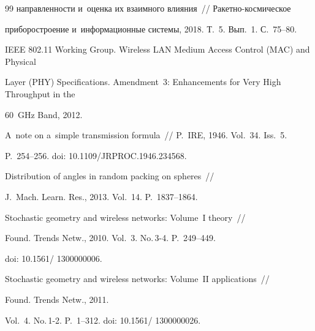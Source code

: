 {{\begin{thebibliography}{99}
направленности и~оценка их взаимного влияния~/\!\!/ Ракетно-космическое 


приборостроение и~информационные системы, 2018. Т.~5. Вып.~1. С.~75--80. 




IEEE 802.11 Working Group. Wireless LAN Medium Access Control (MAC) and Physical 


Layer (PHY) Specifications. Amendment~3: Enhancements for Very High Throughput in the 


60~GHz Band, 2012. 




 A~note on a~simple transmission formula~/\!\!/ P.~IRE, 1946. Vol.~34. Iss.~5. 


P.~254--256. doi: 10.1109/JRPROC.1946.234568.




 Distribution of angles in random packing on spheres~/\!\!/ 


J.~Mach. Learn. Res., 2013. Vol.~14. P.~1837--1864.






 Stochastic geometry and wireless networks: Volume~I theory~/\!\!/ 


Found. Trends Netw., 2010. Vol.~3. No.\,3-4. P.~249--449.


doi: 10.1561\!/ 1300000006.









Stochastic geometry and wireless networks: Volume~II applications~/\!\!/ 


Found. Trends Netw., 2011. 


Vol.~4. No.\,1-2. P.~1--312. doi: 10.1561\!/ 1300000026.





\end{thebibliography}


} }








\vspace*{-3pt}





